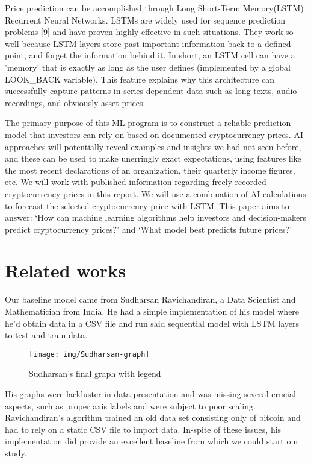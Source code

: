 \documentclass[compsoc]{IEEEtran}
\begin{document}
Price prediction can be accomplished through Long Short-Term Memory(LSTM) Recurrent Neural Networks. LSTMs are widely used for sequence prediction problems [9] and have proven highly effective in such situations. They work so well because LSTM layers store past important information back to a defined point, and forget the information behind it. In short, an LSTM cell can have a 'memory' that is exactly as long as the user defines (implemented by a global LOOK\_BACK variable). This feature explains why this architecture can successfully capture patterns in series-dependent data such as long texts, audio recordings, and obviously asset prices.

The primary purpose of this ML program is to construct a reliable prediction model that investors can rely on based on documented cryptocurrency prices. AI approaches will potentially reveal examples and insights we had not seen before, and these can be used to make unerringly exact expectations, using features like the most recent declarations of an organization, their quarterly income figures, etc.
We will work with published information regarding freely recorded cryptocurrency prices in this report. We will use a combination of AI calculations to forecast the selected cryptocurrency price with LSTM. This paper aims to answer: ‘How can machine learning algorithms help investors and decision-makers predict cryptocurrency prices?’ and ‘What model best predicts future prices?’

\section{Related works} 

Our baseline model came from Sudharsan Ravichandiran, a Data Scientist and Mathematician from India. He had a simple implementation of his model where he'd obtain data in a CSV file and run said sequential model with LSTM layers to test and train data.\cite{ravichandiran_2018}
\begin{figure}[h!]
\texttt{[image: img/Sudharsan-graph]}
\caption{Sudharsan's final graph with legend}
\end{figure}

His graphs were lackluster in data presentation and was missing several crucial aspects, such as proper axis labels and were subject to poor scaling. Ravichandiran's algorithm trained an old data set consisting only of bitcoin and had to rely on a static CSV file to import data. In-spite of these issues, his implementation did provide an excellent baseline from which we could start our study.
\end{document}
